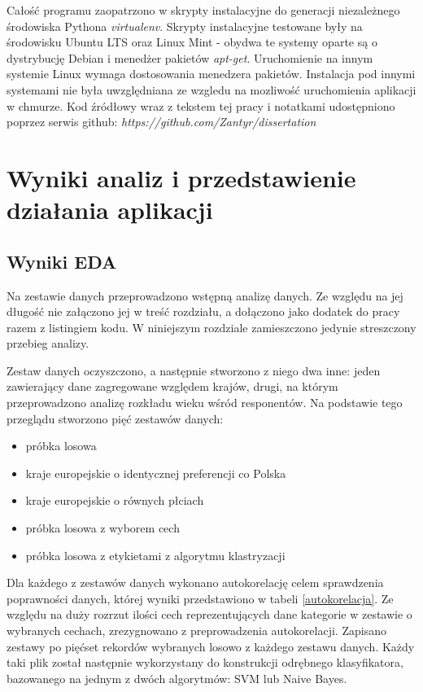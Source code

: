 \documentclass[12pt,a4paper,oneside]{report} %
\begin{document}
Całość programu zaopatrzono w skrypty instalacyjne do generacji niezależnego środowiska Pythona \emph{virtualenv}. Skrypty instalacyjne testowane były na środowisku Ubuntu LTS oraz Linux Mint - obydwa te systemy oparte są o dystrybucję Debian i menedżer pakietów \emph{apt-get}. Uruchomienie na innym systemie Linux wymaga dostosowania menedzera pakietów. Instalacja pod innymi systemami nie była uwzględniana ze wzgledu na mozliwość uruchomienia aplikacji w chmurze.  Kod źródłowy wraz z tekstem tej pracy i notatkami udostępniono poprzez serwis github: \emph{https://github.com/Zantyr/dissertation}\par

\chapter{Wyniki analiz i przedstawienie działania aplikacji}



\section{Wyniki EDA}

Na zestawie danych przeprowadzono wstępną analizę danych. Ze względu na jej długość nie załączono jej w treść rozdziału, a dołączono jako dodatek do pracy razem z listingiem kodu. W niniejszym rozdziale zamieszczono jedynie streszczony przebieg analizy. \par

Zestaw danych oczyszczono, a następnie stworzono z niego dwa inne: jeden zawierający dane zagregowane względem krajów, drugi, na którym przeprowadzono analizę rozkładu wieku wśród responentów.  Na podstawie tego przeglądu stworzono pięć zestawów danych: \par

\begin{itemize}
\item próbka losowa
\item kraje europejskie o identycznej preferencji co Polska
\item kraje europejskie o równych płciach
\item próbka losowa z wyborem cech
\item próbka losowa z etykietami z algorytmu klastryzacji
\end{itemize}

Dla każdego z zestawów danych wykonano autokorelację celem sprawdzenia poprawności danych, której wyniki przedstawiono w tabeli \ref{autokorelacja}. Ze względu na duży rozrzut ilości cech reprezentujących dane kategorie w zestawie o wybranych cechach, zrezygnowano z preprowadzenia autokorelacji. Zapisano zestawy po pięćset rekordów wybranych losowo z każdego zestawu danych. Każdy taki plik został następnie wykorzystany do konstrukcji odrębnego klasyfikatora, bazowanego na jednym z dwóch algorytmów: SVM lub Naive Bayes.\par
\end{document}
